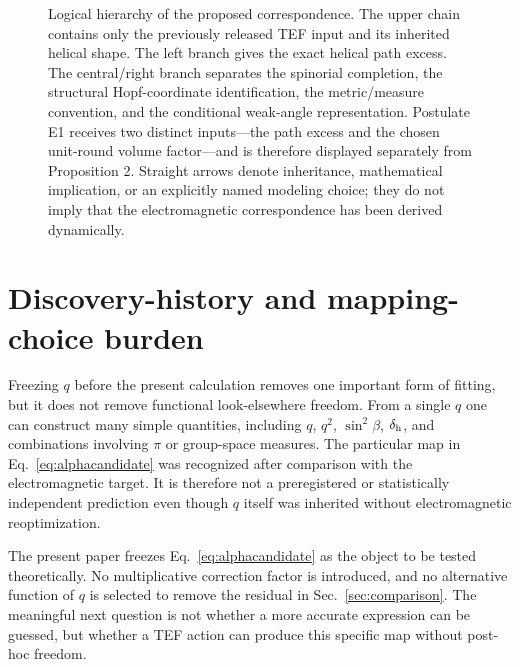\documentclass[10pt,twocolumn]{article}
\newcommand{\TEF}{\mathrm{TEF}}
\begin{document}
\begin{figure}[t]
\caption{Logical hierarchy of the proposed correspondence.  The upper chain contains only the
previously released TEF input and its inherited helical shape.  The left branch gives the exact
helical path excess.  The central/right branch separates the spinorial completion, the structural
Hopf-coordinate identification, the metric/measure convention, and the conditional weak-angle
representation.  Postulate E1 receives two distinct inputs---the path excess and the chosen
unit-round volume factor---and is therefore displayed separately from Proposition 2.  Straight
arrows denote inheritance, mathematical implication, or an explicitly named modeling choice; they
do not imply that the electromagnetic correspondence has been derived dynamically.}
\label{fig:logic}
\end{figure}

\section{Discovery-history and mapping-choice burden}

Freezing $q$ before the present calculation removes one important form of fitting, but it does not
remove functional look-elsewhere freedom.  From a single $q$ one can construct many simple
quantities, including $q$, $q^2$, $\sin^2\beta$, $\delta_{\rm h}$, and combinations involving
$\pi$ or group-space measures.  The particular map in Eq.~\eqref{eq:alphacandidate} was recognized
after comparison with the electromagnetic target.  It is therefore not a preregistered or
statistically independent prediction even though $q$ itself was inherited without electromagnetic
reoptimization.

The present paper freezes Eq.~\eqref{eq:alphacandidate} as the object to be tested theoretically.
No multiplicative correction factor is introduced, and no alternative function of $q$ is selected to
remove the residual in Sec.~\ref{sec:comparison}.  The meaningful next question is not whether a
more accurate expression can be guessed, but whether a TEF action can produce this specific map
without post-hoc freedom.
\end{document}
